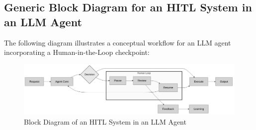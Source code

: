 \subsection*{Generic Block Diagram for an HITL System in an LLM Agent}
The following diagram illustrates a conceptual workflow for an LLM agent incorporating a Human-in-the-Loop checkpoint:

\begin{figure}[htbp]
    \centering
    \includegraphics[width=\textwidth]{diagrams/hitl_system.png}
    \caption{Block Diagram of an HITL System in an LLM Agent}
    \label{fig:hitl_system}
\end{figure}

